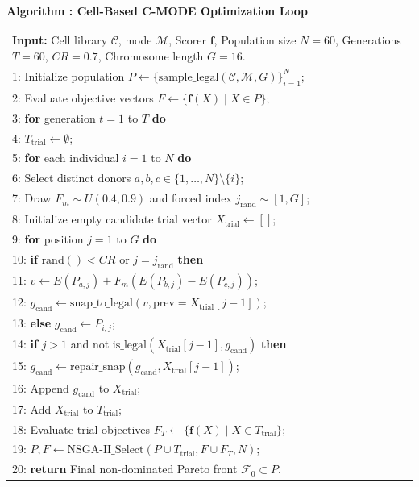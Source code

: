 \documentclass[conference,letterpaper]{IEEEtran}
\newcounter{algorithm}
\begin{document}
\begin{table}[t]
\label{alg:cmode}
\centering\footnotesize
\textbf{Algorithm \thealgorithm: Cell-Based C-MODE Optimization Loop}\par\smallskip
\begin{tabular}{@{}p{}@{}}
\toprule
\textbf{Input:} Cell library $\mathcal{C}$, mode $\mathcal{M}$, Scorer $\mathbf{f}$, Population size $N=60$, Generations $T=60$, $CR=0.7$, Chromosome length $G=16$.\\
1: Initialize population $P \leftarrow \{ \text{sample\_legal}(\mathcal{C}, \mathcal{M}, G) \}_{i=1}^N$;\\
2: Evaluate objective vectors $F \leftarrow \{ \mathbf{f}(X) \mid X \in P \}$;\\
3: \textbf{for} generation $t = 1$ to $T$ \textbf{do}\\
4: \quad $T_{\text{trial}} \leftarrow \emptyset$;\\
5: \quad \textbf{for} each individual $i = 1$ to $N$ \textbf{do}\\
6: \qquad Select distinct donors $a, b, c \in \{1, \dots, N\} \setminus \{i\}$;\\
7: \qquad Draw $F_m \sim U(0.4, 0.9)$ and forced index $j_{\text{rand}} \sim [1, G]$;\\
8: \qquad Initialize empty candidate trial vector $X_{\text{trial}} \leftarrow []$;\\
9: \qquad \textbf{for} position $j = 1$ to $G$ \textbf{do}\\
10: \qquad\quad \textbf{if} $\text{rand}() < CR$ or $j = j_{\text{rand}}$ \textbf{then}\\
11: \qquad\qquad $v \leftarrow E(P_{a,j}) + F_m (E(P_{b,j}) - E(P_{c,j}))$;\\
12: \qquad\qquad $g_{\text{cand}} \leftarrow \text{snap\_to\_legal}(v, \text{prev}=X_{\text{trial}}[j-1])$;\\
13: \qquad\quad \textbf{else} $g_{\text{cand}} \leftarrow P_{i,j}$;\\
14: \qquad\quad \textbf{if} $j > 1$ and not $\text{is\_legal}(X_{\text{trial}}[j-1], g_{\text{cand}})$ \textbf{then}\\
15: \qquad\qquad $g_{\text{cand}} \leftarrow \text{repair\_snap}(g_{\text{cand}}, X_{\text{trial}}[j-1])$;\\
16: \qquad\quad Append $g_{\text{cand}} \text{ to } X_{\text{trial}}$;\\
17: \qquad Add $X_{\text{trial}}$ to $T_{\text{trial}}$;\\
18: \quad Evaluate trial objectives $F_T \leftarrow \{ \mathbf{f}(X) \mid X \in T_{\text{trial}} \}$;\\
19: \quad $P, F \leftarrow \text{NSGA-II\_Select}(P \cup T_{\text{trial}}, F \cup F_T, N)$;\\
20: \textbf{return} Final non-dominated Pareto front $\mathcal{F}_0 \subset P$.\\
\bottomrule
\end{tabular}
\end{table}
\end{document}
